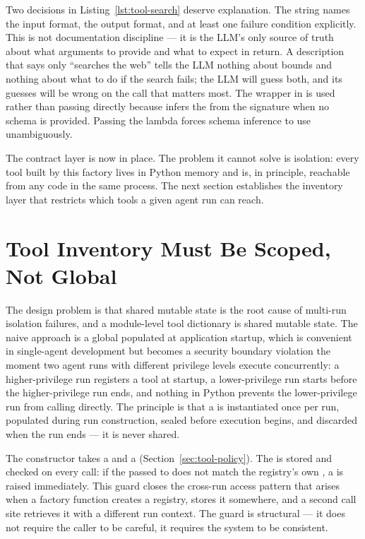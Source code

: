 Two decisions in Listing~\ref{lst:tool-search} deserve explanation. The
 string names the input format, the output format, and at
least one failure condition explicitly. This is not documentation discipline
--- it is the LLM's only source of truth about what arguments to provide
and what to expect in return. A description that says only ``searches the
web'' tells the LLM nothing about  bounds and nothing
about what to do if the search fails; the LLM will guess both, and its
guesses will be wrong on the call that matters most. The 
wrapper in  is used rather than passing 
directly because  infers the
 from the  signature when no schema is
provided. Passing the lambda forces schema inference to use
 unambiguously.

The contract layer is now in place. The problem it cannot solve is
isolation: every tool built by this factory lives in Python memory and is,
in principle, reachable from any code in the same process. The next section
establishes the inventory layer that restricts which tools a given agent
run can reach.


\section{Tool Inventory Must Be Scoped, Not Global}
\label{sec:tool-registry}

The design problem is that shared mutable state is the root cause of
multi-run isolation failures, and a module-level tool dictionary is shared
mutable state. The naive approach is a global  populated at application startup, which is
convenient in single-agent development but becomes a security boundary
violation the moment two agent runs with different privilege levels execute
concurrently: a higher-privilege run registers a  tool
at startup, a lower-privilege run starts before the higher-privilege run
ends, and nothing in Python prevents the lower-privilege run from calling
 directly. The principle is that a
 is instantiated once per run, populated during run
construction, sealed before execution begins, and discarded when the run
ends --- it is never shared.

The  constructor takes a  and a
 (Section~\ref{sec:tool-policy}). The  is
stored and checked on every  call: if the 
passed to  does not match the registry's own
, a  is raised immediately. This
guard closes the cross-run access pattern that arises when a factory
function creates a registry, stores it somewhere, and a second call site
retrieves it with a different run context. The guard is structural --- it
does not require the caller to be careful, it requires the system to be
consistent.

